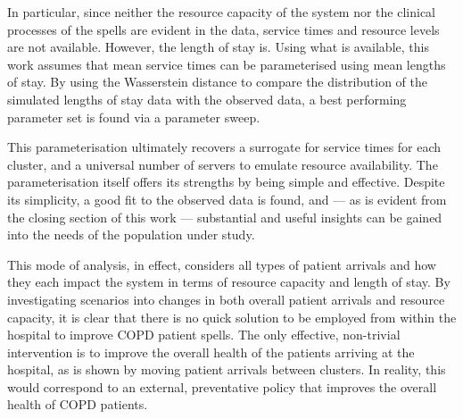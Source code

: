 In particular, since neither the resource capacity of the system nor the
clinical processes of the spells are evident in the data, service times and
resource levels are not available. However, the length of stay is. Using what is
available, this work assumes that mean service times can be parameterised using
mean lengths of stay. By using the Wasserstein distance to compare the
distribution of the simulated lengths of stay data with the observed data, a
best performing parameter set is found via a parameter sweep.

This parameterisation ultimately recovers a surrogate for service times for each
cluster, and a universal number of servers to emulate resource availability. The
parameterisation itself offers its strengths by being simple and effective.
Despite its simplicity, a good fit to the observed data is found, and --- as is
evident from the closing section of this work --- substantial and useful
insights can be gained into the needs of the population under study.

This mode of analysis, in effect, considers all types of patient arrivals and
how they each impact the system in terms of resource capacity and length of
stay. By investigating scenarios into changes in both overall patient arrivals
and resource capacity, it is clear that there is no quick solution to be
employed from within the hospital to improve COPD patient spells. The only
effective, non-trivial intervention is to improve the overall health of the
patients arriving at the hospital, as is shown by moving patient arrivals
between clusters. In reality, this would correspond to an external, preventative
policy that improves the overall health of COPD patients.
